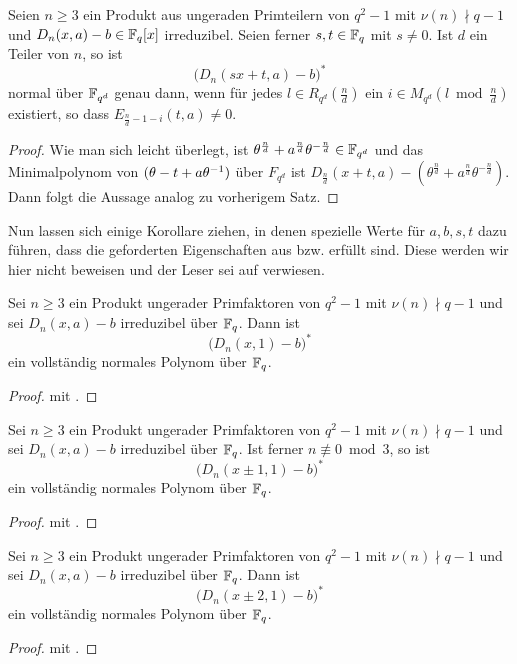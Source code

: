 \begin{satz}%
  \label{satz:scheerhorn4}
  Seien $n\geq 3$ ein Produkt aus ungeraden Primteilern von 
  $q^2-1$ mit $\nu(n)\nmid q-1$ und
  $D_n(x,a)-b \in \mathbb{F}_q[x]$ irreduzibel. Seien ferner $s,t\in \mathbb{F}_q$ mit
  $s\neq 0$. Ist $d$ ein Teiler von $n$, so ist
  \[ \big(D_n(sx+t,a)-b\big)^\ast\]
  normal über $\mathbb{F}_{q^d}$ genau dann, wenn für jedes 
  $l\in R_{q^d}(\tfrac n d)$ ein
  $i\in M_{q^d}(l\bmod \tfrac n d)$ existiert, so dass 
  $E_{\frac n d -1-i}(t,a)\neq 0$.
\end{satz}
\begin{proof}
  Wie man sich leicht überlegt, ist 
  $\theta^{\frac n d}+a^{\frac n d} \theta^{-\frac n d} \in \mathbb{F}_{q^d}$ 
  und das Minimalpolynom von 
  $(\theta -t+a\theta^{-1})$ über $F_{q^d}$ ist 
  $D_{\frac n d}(x+t,a) - (\theta^{\frac n d}+a^{\frac n d}\theta^{-\frac n
  d})$. Dann folgt die Aussage analog zu vorherigem Satz.
\end{proof}


Nun lassen sich einige Korollare ziehen, in denen spezielle Werte für $a,b,s,t$
dazu führen, dass die geforderten Eigenschaften aus 
 bzw.  erfüllt sind.
Diese werden wir hier nicht beweisen und der Leser sei auf
\autocite{scheerhorn:1997} verwiesen.


\begin{kor}
  Sei $n\geq 3$ ein Produkt ungerader Primfaktoren von $q^2-1$ mit
  $\nu(n)\nmid q-1$ und sei
  $D_n(x,a) -b$ irreduzibel über $\mathbb{F}_q$. Dann ist
  \[ \big(D_n(x,1) -b\big)^\ast\]
  ein vollständig normales Polynom über $\mathbb{F}_q$.
\end{kor}
\begin{proof}
  \autocite[Corollary 1]{scheerhorn:1997} mit
  .
\end{proof}


\begin{kor}
  Sei $n\geq 3$ ein Produkt ungerader Primfaktoren von $q^2-1$
  mit $\nu(n)\nmid q-1$ und sei
  $D_n(x,a) -b$ irreduzibel über $\mathbb{F}_q$. Ist ferner $n\nequiv 0 \bmod 3$, so
  ist
  \[ \big(D_n(x\pm 1,1) -b\big)^\ast\]
  ein vollständig normales Polynom über $\mathbb{F}_q$.
\end{kor}
\begin{proof}
  \autocite[Corollary 2]{scheerhorn:1997} mit 
  .
\end{proof}

\begin{kor}
  Sei $n\geq 3$ ein Produkt ungerader Primfaktoren von $q^2-1$ mit
  $\nu(n)\nmid q-1$ und sei
  $D_n(x,a) -b$ irreduzibel über $\mathbb{F}_q$. Dann ist
  \[ \big(D_n(x\pm 2,1) -b\big)^\ast\]
  ein vollständig normales Polynom über $\mathbb{F}_q$.
\end{kor}
\begin{proof}
  \autocite[Corollary 3]{scheerhorn:1997} mit 
  .
\end{proof}




